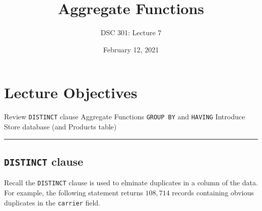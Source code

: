 \documentclass{article}
\newtheorem{definition}{Definition}
\begin{document}
\title{Aggregate Functions}
\author{DSC 301: Lecture 7}
\date{February 12, 2021} %
\maketitle





\begin{outline}[enumerate]

\end{outline}
\begin{outline}
        
\end{outline}




\section*{Lecture Objectives}
\begin{outline}
        \1  Review \texttt{DISTINCT} clause
        \1  Aggregate Functions
        \1  \texttt{GROUP BY} and \texttt{HAVING}
        \1 Introduce Store database (and Products table)
       
       
        

\end{outline}

\hspace{-0.5cm}\rule[-0.101in]{\textwidth}{0.0025in}
% 
% 










\subsection*{\texttt{DISTINCT} clause}
Recall the \texttt{DISTINCT} clause is used to elminate duplicates in a column of the data.  For example, the following statement returns $108,
714$ records containing obvious duplicates in the \texttt{carrier} field.
\end{document}

